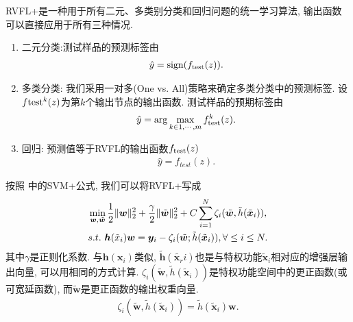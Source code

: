 RVFL+是一种用于所有二元、多类别分类和回归问题的统一学习算法, 输出函数可以直接应用于所有三种情况.
\begin{enumerate}
    \item 二元分类:测试样品的预测标签由
\begin{align}
    \hat y = \textup{sign}(f_{\textup{test}}(z)).
\end{align}
    \item 多类分类: 我们采用一对多(One vs. All)策略来确定多类分类中的预测标签. 设$f{\textup{test}}^k(z)$为第$k$个输出节点的输出函数. 测试样品的预期标签由
\begin{align}
    \hat y = \arg \max_{ k \in 1,\cdots,m} f_{\textup{test}}^k (z).
\end{align}
  \item  回归: 预测值等于RVFL的输出函数$f_{\textup{test}}(z)$
\begin{align}
    \hat y = f_{test}(z).
\end{align}
\end{enumerate}

按照 \cite{VAPNIK2009544} 中的SVM+公式, 我们可以将RVFL+写成
\begin{align}
    &\min\limits_{{\bm w},\tilde {\bm w}} \frac 1 2 \|{\bm w}\|_2^ 2 + \frac \gamma 2 \|\tilde {\bm w}\|_2^ 2 + C\sum_{i=1}^N \zeta_i (\tilde {\bm w}, {\tilde h}({\tilde {\bm x}}_i)),\notag\\
    &s.t.\,\, \bm h(\tilde x_i){\bm w} = \bm y_i - \zeta_i (\tilde {\bm w}; {\tilde h}({\tilde {\bm x}}_i)), \forall \leq i \leq  N.
    \label{RVFL20181102eq8}
\end{align}
其中$\gamma$是正则化系数. 与$\bm h(\bm x_i)$类似, ${\tilde{\bm h}}({\tilde{\bm x_r}}i)$也是与特权功能${\tilde{\bm x}_i}$相对应的增强层输出向量, 可以用相同的方式计算.
$\zeta_i(\tilde{\bm w},{\tilde h}(\tilde{\bm x}_i))$是特权功能空间中的更正函数(或可宽延函数), 而$\tilde{\bm w}$是更正函数的输出权重向量.
\begin{align}\label{RVFL20181102eq9}
    \zeta_i (\tilde {\bm w}, {\tilde h}({\tilde {\bm x}}_i)) = {\tilde h}({\tilde {\bm x}}_i){\bm w}.
\end{align}

